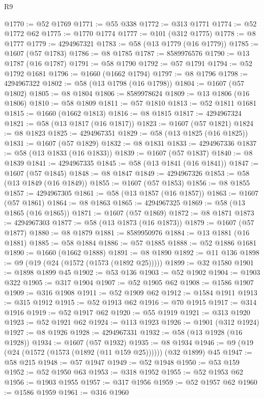 \begin{lexlean}{R9}
\begin{coremodule}
@1770 := @52 @1769
@1771 := @55 @338
@1772 := @313 @1771
@1774 := @52 @1772 @62
@1775 := @1770 @1774
@1777 := @101 (@312 @1775)
@1778 := @8 @1777
@1779 := 4294967321
@1783 := @58 (@13 @1779 (@16 @1779))
@1785 := @1607 (@57 @1783)
@1786 := @8 @1785
@1787 := 8589976576
@1790 := @13 @1787 (@16 @1787)
@1791 := @58 @1790
@1792 := @57 @1791
@1794 := @52 @1792 @1681
@1796 := @1660 (@1662 @1794)
@1797 := @8 @1796
@1798 := 4294967322
@1802 := @58 (@13 @1798 (@16 @1798))
@1804 := @1607 (@57 @1802)
@1805 := @8 @1804
@1806 := 8589978624
@1809 := @13 @1806 (@16 @1806)
@1810 := @58 @1809
@1811 := @57 @1810
@1813 := @52 @1811 @1681
@1815 := @1660 (@1662 @1813)
@1816 := @8 @1815
@1817 := 4294967324
@1821 := @58 (@13 @1817 (@16 @1817))
@1823 := @1607 (@57 @1821)
@1824 := @8 @1823
@1825 := 4294967351
@1829 := @58 (@13 @1825 (@16 @1825))
@1831 := @1607 (@57 @1829)
@1832 := @8 @1831
@1833 := 4294967336
@1837 := @58 (@13 @1833 (@16 @1833))
@1839 := @1607 (@57 @1837)
@1840 := @8 @1839
@1841 := 4294967335
@1845 := @58 (@13 @1841 (@16 @1841))
@1847 := @1607 (@57 @1845)
@1848 := @8 @1847
@1849 := 4294967326
@1853 := @58 (@13 @1849 (@16 @1849))
@1855 := @1607 (@57 @1853)
@1856 := @8 @1855
@1857 := 4294967305
@1861 := @58 (@13 @1857 (@16 @1857))
@1863 := @1607 (@57 @1861)
@1864 := @8 @1863
@1865 := 4294967325
@1869 := @58 (@13 @1865 (@16 @1865))
@1871 := @1607 (@57 @1869)
@1872 := @8 @1871
@1873 := 4294967303
@1877 := @58 (@13 @1873 (@16 @1873))
@1879 := @1607 (@57 @1877)
@1880 := @8 @1879
@1881 := 8589950976
@1884 := @13 @1881 (@16 @1881)
@1885 := @58 @1884
@1886 := @57 @1885
@1888 := @52 @1886 @1681
@1890 := @1660 (@1662 @1888)
@1891 := @8 @1890
@1892 := @11 @136
@1898 := @9 (@19 (@24 (@1572 (@1573 (@1892 @25)))))
@1899 := @32 @1580
@1901 := @1898 @1899 @45
@1902 := @53 @136
@1903 := @52 @1902
@1904 := @1903 @322
@1905 := @317 @1904
@1907 := @52 @1905 @62
@1908 := @1586 @1907
@1909 := @316 @1908
@1911 := @52 @1909 @62
@1912 := @1584 @1911
@1913 := @315 @1912
@1915 := @52 @1913 @62
@1916 := @70 @1915
@1917 := @314 @1916
@1919 := @52 @1917 @62
@1920 := @55 @1919
@1921 := @313 @1920
@1923 := @52 @1921 @62
@1924 := @113 @1923
@1926 := @1901 (@312 @1924)
@1927 := @8 @1926
@1928 := 4294967331
@1932 := @58 (@13 @1928 (@16 @1928))
@1934 := @1607 (@57 @1932)
@1935 := @8 @1934
@1946 := @9 (@19 (@24 (@1572 (@1573 (@1892 (@11 @159 @25)))))) (@32 @1899) @45
@1947 := @58 @215
@1948 := @57 @1947
@1949 := @52 @1948
@1950 := @53 @159
@1952 := @52 @1950 @63
@1953 := @318 @1952
@1955 := @52 @1953 @62
@1956 := @1903 @1955
@1957 := @317 @1956
@1959 := @52 @1957 @62
@1960 := @1586 @1959
@1961 := @316 @1960

\end{coremodule}
\end{lexlean}
